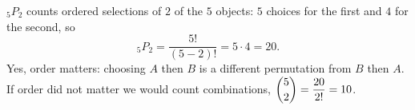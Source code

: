 ${}_5P_2$ counts ordered selections of $2$ of the $5$ objects: $5$ choices for the first and $4$ for the second, so
\[
{}_5P_2=\dfrac{5!}{(5-2)!}=5\cdot4=\boxed{20}.
\]
Yes, order matters: choosing $A$ then $B$ is a different permutation from $B$ then $A$. If order did not matter we would count combinations, $\dbinom52=\dfrac{20}{2!}=10$.
